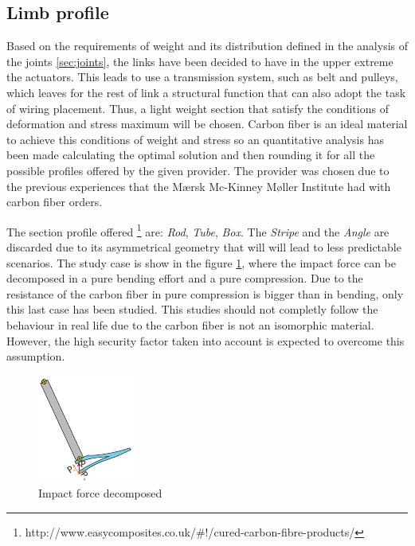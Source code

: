\subsection{Limb profile} %
\label{sub:limb_profile}
Based on the requirements of weight and its distribution defined in the analysis of the joints \ref{sec:joints}, the links have been decided to have in the upper extreme the actuators. 
This leads to use a transmission system, such as belt and pulleys, which leaves for the rest of link a structural function that can also adopt the task of wiring placement.
Thus, a light weight section that satisfy the conditions of deformation and stress maximum will be chosen.
Carbon fiber is an ideal material to achieve this conditions of weight and stress so an quantitative analysis has been made calculating the optimal solution and then rounding it for all the possible profiles offered by the given provider.
The provider was chosen due to the previous experiences that the Mærsk Mc-Kinney Møller Institute had with carbon fiber orders.

The section profile offered \footnote{http://www.easycomposites.co.uk/\#!/cured-carbon-fibre-products/} are: \textit{Rod}, \textit{Tube}, \textit{Box}. The \textit{Stripe} and the \textit{Angle} are discarded due to its asymmetrical geometry that will will lead to less predictable scenarios.
The study case is show in the figure \ref{fig:impact_decomposition}, where the impact force can be decomposed in a pure bending effort and a pure compression.
Due to the resistance of the carbon fiber in pure compression is bigger than in bending, only this last case has been studied.
This studies should not completly follow the behaviour in real life due to the carbon fiber is not an isomorphic material.
However, the high security factor taken into account is expected to overcome this assumption.

\begin{figure}[ht!]
  \centering
  \includegraphics[width=.3\textwidth]{figures/impact_decomposition.pdf}
  \caption{Impact force decomposed}
  \label{fig:impact_decomposition}
\end{figure}

